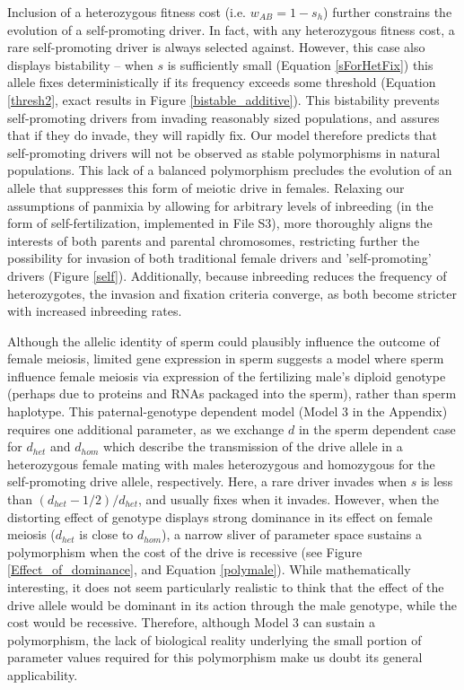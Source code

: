 \documentclass[12pt,letterpaper]{article}
\begin{document}
Inclusion of a heterozygous fitness cost (i.e. $w_{AB}=1-s_h$)
	further constrains the evolution of a self-promoting driver. 
In fact, with any heterozygous fitness cost, a rare self-promoting
	driver is always selected against. 
However, this case also displays bistability -- 
	when $s$ is sufficiently small (Equation \ref{sForHetFix}) this allele fixes deterministically if its 
	frequency exceeds some threshold  (Equation \ref{thresh2}, exact results in 
	Figure \ref{bistable_additive}).
This bistability prevents self-promoting drivers from invading 	
	reasonably sized populations, and assures that if they do invade, they will rapidly fix.
Our model therefore predicts that self-promoting drivers will not be
	observed as stable polymorphisms in natural populations. 
This lack of a balanced polymorphism %
	precludes the evolution of an
	allele that suppresses this form of meiotic drive in females. 
Relaxing our assumptions of panmixia by allowing for 
  arbitrary levels of inbreeding (in the form of self-fertilization, implemented in File S3),
  more thoroughly aligns the interests of both parents and
  parental chromosomes, restricting further the possibility for
  invasion of both traditional female drivers and 'self-promoting'
  drivers (Figure \ref{self}). Additionally, because inbreeding reduces
  the frequency of heterozygotes, the invasion and fixation criteria
  converge, as both become stricter with increased inbreeding rates.\newline 

Although the allelic identity of sperm could plausibly influence the outcome of female meiosis, 
	limited gene expression in sperm \citep[e.g.][]{Joseph2004}
	suggests a model where sperm influence female meiosis via expression of the fertilizing male's
	diploid genotype (perhaps due to proteins and RNAs packaged into the sperm), rather than sperm haplotype.
This paternal-genotype dependent model (Model 3 in the Appendix) requires one additional parameter, as we exchange $d$ in the sperm dependent case for $d_{het}$ and $d_{hom}$ which describe the transmission of the drive allele in a heterozygous female mating with males heterozygous and homozygous for the self-promoting drive allele, respectively.  
Here, a rare driver invades when $s$ is less than $(d_{het}-1/2)/d_{het}$, and usually fixes when it invades.
However, when the distorting effect of genotype displays strong dominance in its
	effect on female meiosis ($d_{het}$ is close to $d_{hom}$), 
	a narrow sliver of parameter space sustains a polymorphism
	when the cost of the drive is recessive
	(see Figure \ref{Effect_of_dominance}, and Equation \ref{polymale}).  
While mathematically interesting, it does not seem particularly realistic to think that the
	effect of the drive allele would be dominant in its action through the
	male genotype, while the cost would be recessive. 
Therefore, although Model 3 can sustain a polymorphism, 
	the lack of biological reality underlying the small portion of parameter values 
	required for this polymorphism make us doubt its general applicability. \newline 
\end{document}

